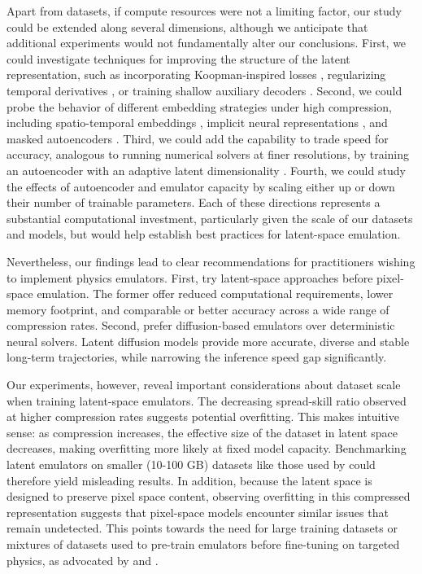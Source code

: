 Apart from datasets, if compute resources were not a limiting factor, our study could be extended along several dimensions, although we anticipate that additional experiments would not fundamentally alter our conclusions. First, we could investigate techniques for improving the structure of the latent representation, such as incorporating Koopman-inspired losses \cite{yeung2019learning, geneva2022transformers}, regularizing temporal derivatives \cite{xie2024smooth}, or training shallow auxiliary decoders \cite{yao2025reconstruction, chen2025masked}. Second, we could probe the behavior of different embedding strategies under high compression, including spatio-temporal embeddings \cite{yu2023magvit, zhou2025text2pde, du2024conditional}, implicit neural representations \cite{chen2023crom, du2024conditional}, and masked autoencoders \cite{he2022masked, chen2025masked}. Third, we could add the capability to trade speed for accuracy, analogous to running numerical solvers at finer resolutions, by training an autoencoder with an adaptive latent dimensionality \cite{karkadaashok2018autoencoders, pham2022pcaae, bachmann2025flextok}. Fourth, we could study the effects of autoencoder and emulator capacity by scaling either up or down their number of trainable parameters. Each of these directions represents a substantial computational investment, particularly given the scale of our datasets and models, but would help establish best practices for latent-space emulation.

Nevertheless, our findings lead to clear recommendations for practitioners wishing to implement physics emulators. First, try latent-space approaches before pixel-space emulation. The former offer reduced computational requirements, lower memory footprint, and comparable or better accuracy across a wide range of compression rates. Second, prefer diffusion-based emulators over deterministic neural solvers. Latent diffusion models provide more accurate, diverse and stable long-term trajectories, while narrowing the inference speed gap significantly.

Our experiments, however, reveal important considerations about dataset scale when training latent-space emulators. The decreasing spread-skill ratio observed at higher compression rates suggests potential overfitting. This makes intuitive sense: as compression increases, the effective size of the dataset in latent space decreases, making overfitting more likely at fixed model capacity. Benchmarking latent emulators on smaller (10-100 GB) datasets like those used by \textcite{kohl2024benchmarking} could therefore yield misleading results. In addition, because the latent space is designed to preserve pixel space content, observing overfitting in this compressed representation suggests that pixel-space models encounter similar issues that remain undetected. This points towards the need for large training datasets or mixtures of datasets used to pre-train emulators before fine-tuning on targeted physics, as advocated by \textcite{mccabe2024multiple} and \textcite{herde2024poseidon}.

